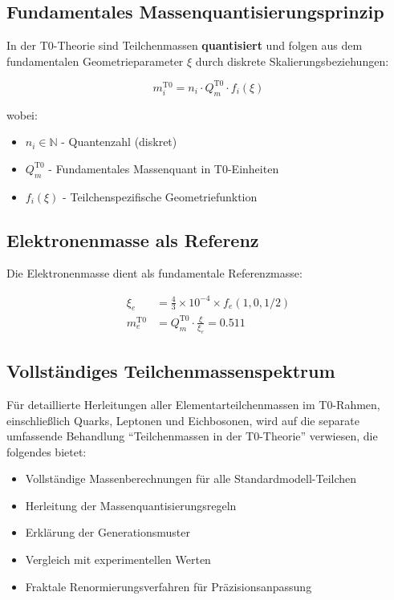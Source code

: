 	\subsection{Fundamentales Massenquantisierungsprinzip}
	
	In der T0-Theorie sind Teilchenmassen \textbf{quantisiert} und folgen aus dem fundamentalen Geometrieparameter $\xi$ durch diskrete Skalierungsbeziehungen:
	
	\begin{equation}
		m_i^{\mathrm{T0}} = n_i \cdot Q_m^{\mathrm{T0}} \cdot f_i(\xi)
	\end{equation}
	
	wobei:
	\begin{itemize}
		\item $n_i \in \mathbb{N}$ - Quantenzahl (diskret)
		\item $Q_m^{\mathrm{T0}}$ - Fundamentales Massenquant in T0-Einheiten
		\item $f_i(\xi)$ - Teilchenspezifische Geometriefunktion
	\end{itemize}
	
	\subsection{Elektronenmasse als Referenz}
	
	Die Elektronenmasse dient als fundamentale Referenzmasse:
	
	\begin{align}
		\xi_e &= \frac{4}{3} \times 10^{-4} \times f_e(1,0,1/2) \\
		m_e^{\mathrm{T0}} &= Q_m^{\mathrm{T0}} \cdot \frac{\xi}{\xi_e} = 0.511
	\end{align}
	
	\subsection{Vollständiges Teilchenmassenspektrum}
	
	Für detaillierte Herleitungen aller Elementarteilchenmassen im T0-Rahmen, einschließlich Quarks, Leptonen und Eichbosonen, wird auf die separate umfassende Behandlung ``Teilchenmassen in der T0-Theorie'' verwiesen, die folgendes bietet:
	
	\begin{itemize}
		\item Vollständige Massenberechnungen für alle Standardmodell-Teilchen
		\item Herleitung der Massenquantisierungsregeln
		\item Erklärung der Generationsmuster
		\item Vergleich mit experimentellen Werten
		\item Fraktale Renormierungsverfahren für Präzisionsanpassung
	\end{itemize}
	
